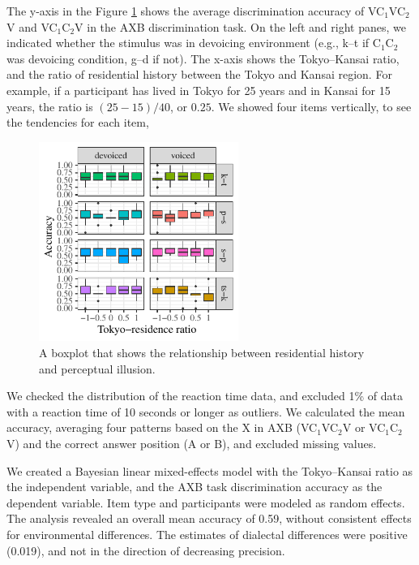 \documentclass[a4paper,11pt,twocolumn]{article}
\begin{document}
The y-axis in the Figure \ref{fig:axb_results} shows the average discrimination accuracy of VC$_\text{1}$VC$_\text{2}$V and VC$_\text{1}$C$_\text{2}$V in the AXB discrimination task. On the left and right panes, we indicated whether the stimulus was in devoicing environment (e.g., k--t if C$_\text{1}$C$_\text{2}$ was devoicing condition, g--d if not). The x-axis shows the Tokyo--Kansai ratio, and the ratio of residential history between the Tokyo and Kansai region. For example, if a participant has lived in Tokyo for 25 years and in Kansai for 15 years, the ratio is $(25-15)/40$, or $0.25$. We showed four items vertically, to see the tendencies for each item,
\begin{figure}[!ht]
\begin{center}
\includegraphics[width=6.5cm]{../results/artifact/results_axb_allophone.pdf}
\caption{A boxplot that shows the relationship between residential history and perceptual illusion.}\label{fig:axb_results}
\end{center}
\end{figure}

We checked the distribution of the reaction time data, and excluded 1\% of data with a reaction time of 10 seconds or longer as outliers. We calculated the mean accuracy, averaging four patterns based on the X in AXB (VC$_\text{1}$VC$_\text{2}$V or VC$_\text{1}$C$_\text{2}$V) and the correct answer position (A or B), and excluded missing values.

We created a Bayesian linear mixed-effects model \cite{lme4, rstanarm, easystats} with the Tokyo--Kansai ratio as the independent variable, and the AXB task discrimination accuracy as the dependent variable. Item type and participants were modeled as random effects. The analysis revealed an overall mean accuracy of 0.59, without consistent effects for environmental differences. The estimates of dialectal differences were positive (0.019), and not in the direction of decreasing precision.
\end{document}
